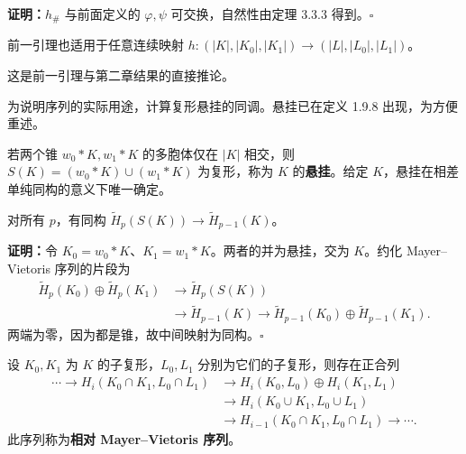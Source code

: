 \noindent\textbf{证明：}$h_\#$ 与前面定义的 $\varphi,\psi$ 可交换，自然性由定理 3.3.3 得到。\hfill$\square$

前一引理也适用于任意连续映射 $h:(|K|,|K_0|,|K_1|)\to(|L|,|L_0|,|L_1|)$。

这是前一引理与第二章结果的直接推论。

为说明序列的实际用途，计算复形悬挂的同调。悬挂已在定义 1.9.8 出现，为方便重述。

若两个锥 $w_0*K,w_1*K$ 的多胞体仅在 $|K|$ 相交，则 $S(K)=(w_0*K)\cup(w_1*K)$ 为复形，称为 $K$ 的\textbf{悬挂}。给定 $K$，悬挂在相差单纯同构的意义下唯一确定。

对所有 $p$，有同构 $\widetilde H_p(S(K))\to\widetilde H_{p-1}(K)$。

\noindent\textbf{证明：}令 $K_0=w_0*K$、$K_1=w_1*K$。两者的并为悬挂，交为 $K$。约化 Mayer--Vietoris 序列的片段为
\[
\begin{aligned}
\widetilde H_p(K_0)\oplus\widetilde H_p(K_1)&\to\widetilde H_p(S(K))\\
&\to\widetilde H_{p-1}(K)\to\widetilde H_{p-1}(K_0)\oplus\widetilde H_{p-1}(K_1).
\end{aligned}
\]
两端为零，因为都是锥，故中间映射为同构。\hfill$\square$

设 $K_0,K_1$ 为 $K$ 的子复形，$L_0,L_1$ 分别为它们的子复形，则存在正合列
\[
\begin{aligned}
\cdots\to H_i(K_0\cap K_1,L_0\cap L_1)
&\to H_i(K_0,L_0)\oplus H_i(K_1,L_1)\\
&\to H_i(K_0\cup K_1,L_0\cup L_1)\\
&\to H_{i-1}(K_0\cap K_1,L_0\cap L_1)\to\cdots.
\end{aligned}
\]
此序列称为\textbf{相对 Mayer--Vietoris 序列}。

